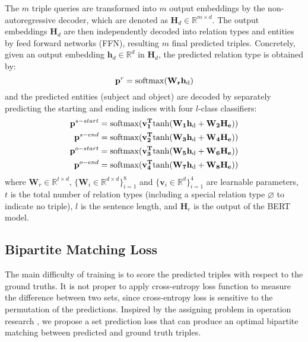 \documentclass[letterpaper]{article} \usepackage{aaai21}  \usepackage{times}  \usepackage{helvet} \usepackage{courier}  \usepackage[hyphens]{url}  \usepackage{graphicx} \usepackage{amsfonts,amssymb}
\begin{document}
The $m$ triple queries are transformed into $m$ output embeddings by the non-autoregressive decoder, which are denoted as $\mathbf{H}_d \in \mathbb{R}^{m \times d}$. The output embeddings $\mathbf{H}_d$ are then independently decoded into relation types and entities by feed forward networks (FFN), resulting $m$ final predicted triples. Concretely, given an output embedding $\mathbf{h}_d \in \mathbb{R}^d$ in $\mathbf{H}_d$, the predicted relation type is obtained by:
\begin{equation}
    \mathbf{p}^r = \rm{softmax}(\mathbf{W_r} \mathbf{h}_d)
    \label{pr}
\end{equation}
and the predicted entities (subject and object) are decoded by separately predicting the starting and ending indices with four $l$-class classifiers:
\begin{align}
\mathbf{p}^{s-start} = \rm{softmax}(\mathbf{v_1^T}\rm{tanh}(\mathbf{W_1} \mathbf{h}_d + \mathbf{W_2}\mathbf{H_e}))\\
\mathbf{p}^{s-end}  = \rm{softmax}(\mathbf{v_2^T}\rm{tanh}(\mathbf{W_3} \mathbf{h}_d + \mathbf{W_4}\mathbf{H_e}))\\
\mathbf{p}^{o-start} = \rm{softmax}(\mathbf{v_3^T}\rm{tanh}(\mathbf{W_5} \mathbf{h}_d + \mathbf{W_6}\mathbf{H_e}))\\
\mathbf{p}^{o-end} = \rm{softmax}(\mathbf{v_4^T}\rm{tanh}(\mathbf{W_7} \mathbf{h}_d + \mathbf{W_8}\mathbf{H_e}))
\label{pe}
\end{align}
where $\mathbf{W}_r\in\mathbb{R}^{t\times d}$, $\{\mathbf{W}_i\in\mathbb{R}^{d\times d}\}_{i=1}^8$ and $\{\mathbf{v}_i\in\mathbb{R}^d\}_{i=1}^4$ are learnable parameters, $t$ is the total number of relation types (including a special relation type $\varnothing$ to indicate no triple), $l$ is the sentence length, and $\textbf{H}_e$ is the output of the BERT model.


\subsection{Bipartite Matching Loss}
\label{loss}
The main difficulty of training is to score the predicted triples with respect to the ground truths. It is not proper to apply cross-entropy loss function to measure the difference between two sets, since cross-entropy loss is sensitive to the permutation of the predictions. Inspired by the assigning problem in operation research \cite{kuhn1955hungarian}, we propose a set prediction loss that can produce an optimal bipartite matching between predicted and ground truth triples.
\end{document}
